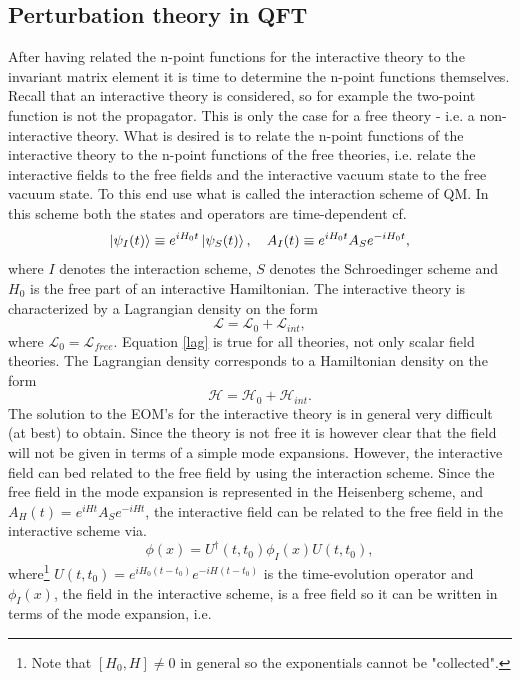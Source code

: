 \subsection*{Perturbation theory in QFT}
After having related the n-point functions for the interactive theory to the invariant matrix element it is time to determine the n-point functions themselves. Recall that an interactive theory is considered, so for example the two-point function is not the propagator. This is only the case for a free theory - i.e. a non-interactive theory. What is desired is to relate the n-point functions of the interactive theory to the n-point functions of the free theories, i.e. relate the interactive fields to the free fields and the interactive vacuum state to the free vacuum state. To this end use what is called the interaction scheme of QM. In this scheme both the states and operators are time-dependent cf.
\begin{equation}
	\ket{\psi_I(t)}\equiv e^{iH_0t}\ket{\psi_S(t)},\quad A_I(t)\equiv e^{iH_0t}A_Se^{-iH_0t},
\end{equation} 
where $I$ denotes the interaction scheme, $S$ denotes the Schroedinger scheme and $H_0$ is the free part of an interactive Hamiltonian. The interactive theory is characterized by a Lagrangian density on the form
\begin{equation}
	\mathcal{L}=\mathcal{L}_{0}+\mathcal{L}_{int},
	\label{lag}
\end{equation} 
where $\mathcal{L}_{0}=\mathcal{L}_{free}$. Equation \eqref{lag} is true for all theories, not only scalar field theories. The Lagrangian density corresponds to a Hamiltonian density on the form
\begin{equation}
	\mathcal{H}=\mathcal{H}_{0}+\mathcal{H}_{int}.
\end{equation} 
The solution to the EOM's for the interactive theory is in general very difficult (at best) to obtain. Since the theory is not free it is however clear that the field will not be given in terms of a simple mode expansions. However, the interactive field can bed related to the free field by using the interaction scheme. Since the free field in the mode expansion is represented in the Heisenberg scheme, and $A_H(t)=e^{iHt}A_Se^{-iHt}$, the interactive field can be related to the free field in the interactive scheme via.
\begin{equation}
	\phi(x)=U^\dagger(t,t_0)\phi_I(x)U(t,t_0),
\end{equation} 
where\footnote{Note that $[H_{0},H]\neq 0$ in general so the exponentials cannot be "collected".} $U(t,t_0)=e^{iH_0(t-t_0)}e^{-iH(t-t_0)}$ is the time-evolution operator and $\phi_I(x)$, the field in the interactive scheme, is a free field so it can be written in terms of the mode expansion,  i.e.
